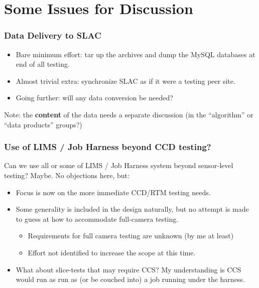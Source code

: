 \documentclass[xcolor=dvipsnames]{beamer}
\begin{document}
\section{Some Issues for Discussion}

\begin{frame}
\end{frame}

\begin{frame}
  \frametitle{Data Delivery to SLAC}

  \begin{itemize}
  \item Bare minimum effort: tar up the archives and dump the MySQL
    databases at end of all testing.
  \item Almost trivial extra: synchronize SLAC as if it were a testing
    peer site.
  \item Going further: will any data conversion be needed?
  \end{itemize}

  Note: the \textbf{content} of the data needs a separate discussion
  (in the ``algorithm'' or ``data products'' groups?)

\end{frame}

\begin{frame}
  \frametitle{Use of LIMS / Job Harness beyond CCD testing?}

  Can we use all or some of LIMS / Job Harness system beyond
  sensor-level testing?  Maybe.  No objections here, but:

  \begin{itemize}
  \item Focus is now on the more immediate CCD/RTM testing needs.
  \item Some generality is included in the design naturally, but no
    attempt is made to guess at how to accommodate full-camera testing.
    \begin{itemize}
    \item Requirements for full camera testing are unknown (by me at least)
    \item Effort not identified to increase the scope at this time.
    \end{itemize}
  \item What about slice-tests that may require CCS?  My understanding
    is CCS would run as run as (or be couched into) a job running
    under the harness.
  \end{itemize}

\end{frame}
\end{document}
